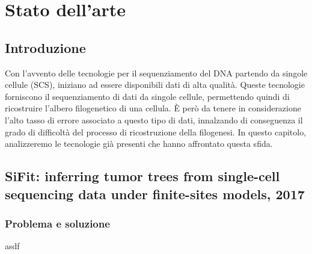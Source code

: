 
\chapter{Stato dell'arte}


\section{Introduzione}

Con l'avvento delle tecnologie per il sequenziamento del DNA partendo da singole cellule (SCS), iniziano ad essere disponibili dati di alta qualità. Queste tecnologie forniscono il sequenziamento di dati da singole cellule, permettendo quindi di ricostruire l'albero filogenetico di una cellula. È però da tenere in considerazione l'alto tasso di errore associato a questo tipo di dati, innalzando di conseguenza il grado di difficoltà del processo di ricostruzione della filogenesi. 
In questo capitolo, analizzeremo le tecnologie già presenti che hanno affrontato questa sfida. 


\section{SiFit: inferring tumor trees from single-cell sequencing data under finite-sites models, 2017 \cite{zafar2017sifit} }

\subsection{Problema e soluzione}

asdf